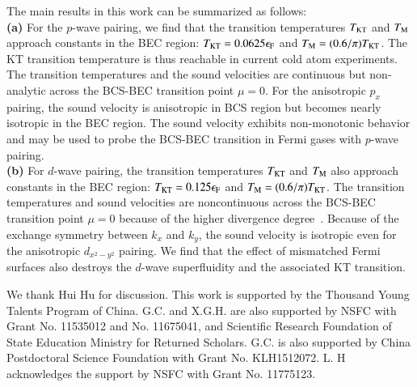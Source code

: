 \documentclass[aps,prd,amsmath,two column,nofootinbib,amssymb,referee]{revtex4}
\begin{document}
The main results in this work can be summarized as follows: \\
\textbf{(a)} For the $p$-wave pairing, we find that the transition temperatures $T_{\rm KT}$ and $T_{\rm M}$ approach constants in the BEC region: $T_{\rm KT}=0.0625\epsilon_{\rm F}$ and $T_{\rm M}={(0.6/\pi)}T_{\rm KT}$. The KT transition temperature is thus reachable in current cold atom experiments. The transition temperatures and the sound velocities are continuous but non-analytic across the BCS-BEC transition point $\mu=0$. For the anisotropic $p_x$ pairing, the sound velocity is anisotropic in BCS region but becomes nearly isotropic in the BEC region. The sound velocity exhibits non-monotonic behavior and may be used to probe the BCS-BEC transition in Fermi gases with $p$-wave pairing. \\
\textbf{(b)} For $d$-wave pairing, the transition temperatures $T_{\rm KT}$ and $T_{\rm M}$ also approach constants in the BEC region: $T_{\rm KT}=0.125\epsilon_{\rm F}$ and $T_{\rm M}={(0.6/\pi)}T_{\rm KT}$. The transition temperatures and sound velocities are noncontinuous across the BCS-BEC transition point $\mu=0$ because of the higher divergence degree~\cite{Cao2013}. Because of the exchange symmetry between $k_x$ and $k_y$, the sound velocity is isotropic even for the anisotropic $d_{x^2-y^2}$ pairing. We find that the effect of mismatched Fermi surfaces also destroys the $d$-wave superfluidity and the associated KT transition.

\acknowledgments
We thank Hui Hu for discussion. This work is supported by the Thousand Young Talents Program of China. G.C. and X.G.H. are also supported by NSFC with Grant No. 11535012 and No. 11675041, and Scientific Research Foundation of State Education Ministry for Returned Scholars. G.C. is also supported by China Postdoctoral Science Foundation with Grant No. KLH1512072. L. H acknowledges the support by NSFC with Grant No. 11775123.
\end{document}
